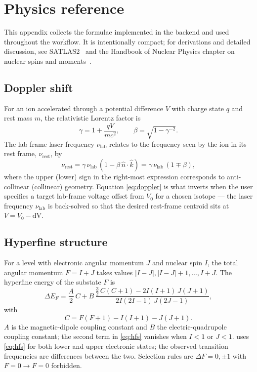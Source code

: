 \section{Physics reference}
\label{sec:physics}

This appendix collects the formulae implemented in the
 backend and used throughout the workflow. It
is intentionally compact; for derivations and detailed discussion,
see SATLAS2~\cite{satlas2} and the Handbook of Nuclear Physics
chapter on nuclear spins and moments~\cite{cls_handbook}.

\subsection{Doppler shift}

For an ion accelerated through a potential difference $V$ with
charge state $q$ and rest mass $m$, the relativistic Lorentz factor
is
\begin{equation}
    \gamma = 1 + \frac{qV}{m c^{2}}, \qquad
    \beta = \sqrt{1 - \gamma^{-2}}.
\end{equation}
The lab-frame laser frequency $\nu_\text{lab}$ relates to the
frequency seen by the ion in its rest frame, $\nu_\text{rest}$, by
\begin{equation}
    \nu_\text{rest} = \gamma\,\nu_\text{lab}\,(1 - \beta\,\hat{n} \cdot \hat{k})
                    = \gamma\,\nu_\text{lab}\,(1 \mp \beta),
    \label{eq:doppler}
\end{equation}
where the upper (lower) sign in the right-most expression
corresponds to anti-collinear (collinear) geometry. Equation
\eqref{eq:doppler} is what \denis{} inverts when the user specifies a
target lab-frame voltage offset  from $V_0$ for a chosen
isotope --- the laser frequency $\nu_\text{lab}$ is back-solved so
that the desired rest-frame centroid sits at $V = V_0 - \mathrm{dV}$.

\subsection{Hyperfine structure}

For a level with electronic angular momentum $J$ and nuclear spin
$I$, the total angular momentum $F = I + J$ takes values
$|I-J|, |I-J|+1, \dots, I+J$. The hyperfine energy of the substate
$F$ is
\begin{equation}
    \Delta E_F = \frac{A}{2}\, C
    + B\,\frac{\frac{3}{2}\,C(C+1) - 2I(I+1)\,J(J+1)}
                {2 I (2I-1)\,J(2J-1)},
    \label{eq:hfs}
\end{equation}
with
\begin{equation}
    C = F(F+1) - I(I+1) - J(J+1).
\end{equation}
$A$ is the magnetic-dipole coupling constant and $B$ the
electric-quadrupole coupling constant; the second term in
\eqref{eq:hfs} vanishes when $I < 1$ or $J < 1$. \denis{} uses
\eqref{eq:hfs} for both lower and upper electronic states; the
observed transition frequencies are differences between the two.
Selection rules are $\Delta F = 0, \pm 1$ with $F = 0 \to F = 0$
forbidden.

